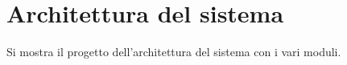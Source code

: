 \chapter{Architettura del sistema}
\label{capitolo4}

Si mostra il progetto dell'architettura del sistema con i vari moduli.
